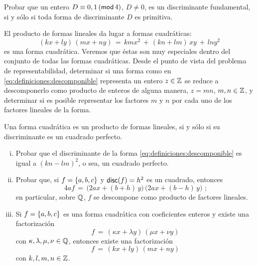 \begin{ejerDefiniciones}\label{ejer:definiciones:fundamental}
	Probar que un entero $D\equiv 0,1\tmodulo[4]$, $D\neq 0$,
	es un discriminante fundamental, si y s\'olo si toda forma
	de discriminante $D$ es primitiva.
\end{ejerDefiniciones}

El producto de formas lineales da lugar a formas cuadr\'aticas:
\begin{equation}
	\label{eq:definiciones:descomponible}
	(kx+ly)\,(mx+ny)\,=\,kmx^2\,+\,(kn+lm)\,xy\,+\,lny^2
\end{equation}
%
es una forma cuadr\'atica. Veremos que \'estas son muy especiales
dentro del conjunto de todas las formas cuadr\'aticas. Desde el punto
de vista del problema de representabilidad, determinar si una forma
como en \eqref{eq:definiciones:descomponible} representa un entero
$z\in\Enteros$ se reduce a descomponerlo como producto de enteros
de alguna manera, $z=mn$, $m,n\in\Enteros$, y determinar si es posible
representar los factores $m$ y $n$ por cada uno de los factores lineales
de la forma.

\begin{ejerDefiniciones}\label{ejer:definiciones:descomponible}
	Una forma cuadr\'atica es un producto de formas lineales,
	si y s\'olo si su discriminante es un cuadrado perfecto.
	\begin{enumerate}[(i)]
		\item\label{item:definiciones:descomponible:i}
			Probar que el discriminante de la forma
			\eqref{eq:definiciones:descomponible} es igual a
			$(kn-lm)^2$, o sea, un cuadrado perfecto.
		\item\label{item:definciones:descomponible:ii}
			Probar que, si $f=\binaria{a,b,c}$ y
			$\discriminante(f)=h^2$ es un cuadrado, entonces
			\begin{displaymath}
				4af\,=\,\big(2ax+(b+h)\,y\big)\,
					\big(2ax+(b-h)\,y\big)
				\text{ ;}
			\end{displaymath}
			en particular,
			sobre $\Racionales$, $f$ se descompone como
			producto de factores lineales.
		\item\label{item:definciones:descomponible:iii}
			Si $f=\binaria{a,b,c}$ es una forma cuadr\'atica
			con coeficientes enteros y existe una
			factorizaci\'on
			\begin{displaymath}
				f\,=\,(\kappa x+\lambda y)\,(\mu x+\nu y)
			\end{displaymath}
			con $\kappa,\lambda,\mu,\nu\in\Racionales$, entonces
			existe una factorizaci\'on
			\begin{displaymath}
				f\,=\,(kx+ly)\,(mx+ny)
			\end{displaymath}
			con $k,l,m,n\in\Enteros$.%
	\end{enumerate}
\end{ejerDefiniciones}

